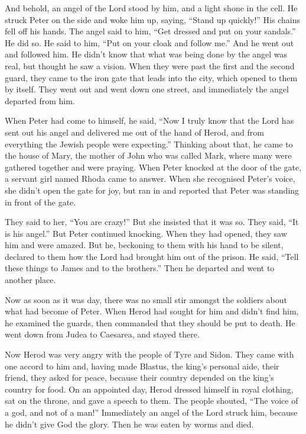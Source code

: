  And behold, an angel of the Lord stood by him, and a
light shone in the cell. He struck Peter on the side and woke him up,
saying, ``Stand up quickly!'' His chains fell off his hands.
 The angel said to him, ``Get dressed and put on your
sandals.'' He did so. He said to him, ``Put on your cloak and follow
me.''  And he went out and followed him. He didn't know
that what was being done by the angel was real, but thought he saw a
vision.  When they were past the first and the second
guard, they came to the iron gate that leads into the city, which opened
to them by itself. They went out and went down one street, and
immediately the angel departed from him.

 When Peter had come to himself, he said, ``Now I truly
know that the Lord has sent out his angel and delivered me out of the
hand of Herod, and from everything the Jewish people were expecting.''
 Thinking about that, he came to the house of Mary, the
mother of John who was called Mark, where many were gathered together
and were praying.  When Peter knocked at the door of the
gate, a servant girl named Rhoda came to answer.  When
she recognised Peter's voice, she didn't open the gate for joy, but ran
in and reported that Peter was standing in front of the gate.

 They said to her, ``You are crazy!'' But she insisted
that it was so. They said, ``It is his angel.''  But
Peter continued knocking. When they had opened, they saw him and were
amazed.  But he, beckoning to them with his hand to be
silent, declared to them how the Lord had brought him out of the prison.
He said, ``Tell these things to James and to the brothers.'' Then he
departed and went to another place.

 Now as soon as it was day, there was no small stir
amongst the soldiers about what had become of Peter. 
When Herod had sought for him and didn't find him, he examined the
guards, then commanded that they should be put to death. He went down
from Judea to Caesarea, and stayed there.

 Now Herod was very angry with the people of Tyre and
Sidon. They came with one accord to him and, having made Blastus, the
king's personal aide, their friend, they asked for peace, because their
country depended on the king's country for food.  On an
appointed day, Herod dressed himself in royal clothing, sat on the
throne, and gave a speech to them.  The people shouted,
``The voice of a god, and not of a man!''  Immediately an
angel of the Lord struck him, because he didn't give God the glory. Then
he was eaten by worms and died.

